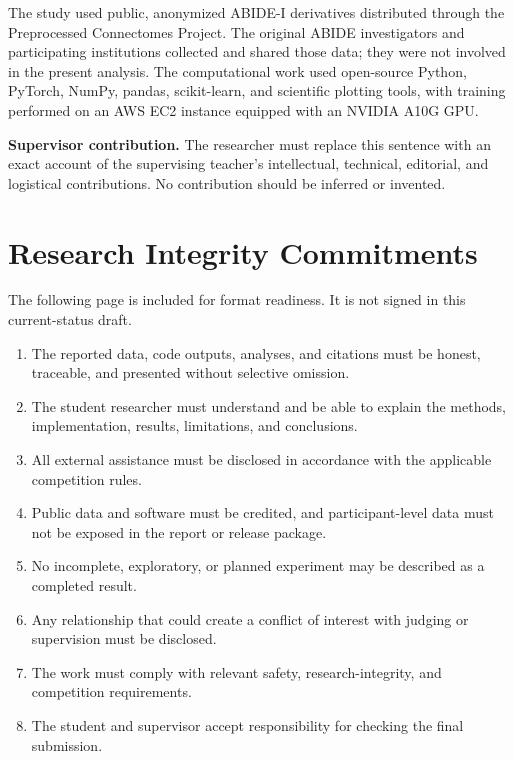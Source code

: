 \documentclass[11pt,a4paper]{article}
\begin{document}
The study used public, anonymized ABIDE-I derivatives distributed through the
Preprocessed Connectomes Project. The original ABIDE investigators and
participating institutions collected and shared those data; they were not
involved in the present analysis. The computational work used open-source
Python, PyTorch, NumPy, pandas, scikit-learn, and scientific plotting tools,
with training performed on an AWS EC2 instance equipped with an NVIDIA A10G
GPU.

\noindent\textbf{Supervisor contribution.} The researcher must replace this
sentence with an exact account of the supervising teacher's intellectual,
technical, editorial, and logistical contributions. No contribution should be
inferred or invented.

\clearpage
\section*{Research Integrity Commitments}

The following page is included for format readiness. It is not signed in this
current-status draft.

\begin{enumerate}[label=\arabic*.,leftmargin=2.2em]
  \item The reported data, code outputs, analyses, and citations must be honest,
  traceable, and presented without selective omission.
  \item The student researcher must understand and be able to explain the
  methods, implementation, results, limitations, and conclusions.
  \item All external assistance must be disclosed in
  accordance with the applicable competition rules.
  \item Public data and software must be credited, and participant-level data
  must not be exposed in the report or release package.
  \item No incomplete, exploratory, or planned experiment may be described as a
  completed result.
  \item Any relationship that could create a conflict of interest with judging
  or supervision must be disclosed.
  \item The work must comply with relevant safety, research-integrity, and
  competition requirements.
  \item The student and supervisor accept responsibility for checking the final
  submission.
\end{enumerate}
\end{document}
